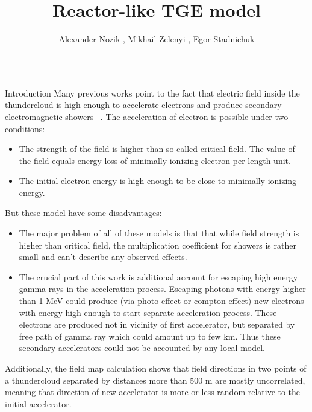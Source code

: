 \documentclass[final,hyperref={pdfpagelabels=false}]{beamer}
\title{Reactor-like TGE model}
\author{Alexander Nozik \inst{1,2}, Mikhail Zelenyi  \inst{1,2,3}, Egor Stadnichuk \inst{1,2}}
\institute{Institute for Nuclear Research of RAS \and
    Moscow Institute of Physics and Technology (State University) \and
    Space Research Institute of RAS}
\begin{document}
    
\begin{frame}{}
	\begin{columns}[t]
		\begin{column}{0.32\linewidth}
			                
			\begin{block}{Introduction}  \justifying
				Many previous works point to the fact that electric field inside the thundercloud is high enough to accelerate electrons and produce secondary electromagnetic showers ~\cite{gurevich1992runaway, gurevich1999lightning,dwyer2003fundamental,dwyer2011low}. The acceleration of electron is possible under two conditions:
				\begin{itemize}
					\item The strength of the field is higher than so-called critical field. The value of the field equals energy loss of minimally ionizing electron per length unit.
					\item The initial electron energy is high enough to be close to minimally ionizing energy.
				\end{itemize}
				                    
				But these model have some disadvantages:
				\begin{itemize}
					\item The major problem of all of these models is that that while field strength is higher than critical field, the multiplication coefficient for showers is rather small and can't describe any observed effects.
					\item   The crucial part of this work is additional account for escaping high energy gamma-rays in the acceleration process. Escaping photons with energy higher than 1 MeV could produce (via photo-effect or compton-effect) new electrons with energy high enough to start separate acceleration process. These electrons are produced not in vicinity of first accelerator, but separated by free path of gamma ray which could amount up to few km. Thus these secondary accelerators could not be accounted by any local model.
				\end{itemize}
				                    
				Additionally, the field map calculation shows that field directions in two points of a thundercloud separated by distances more than 500 m are mostly uncorrelated, meaning that direction of new accelerator is more or less random relative to the initial accelerator.
				

\end{block}
\end{column}
\end{columns}
\end{frame}
\end{document}
